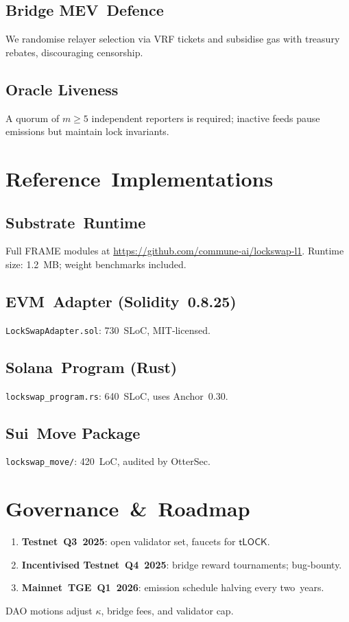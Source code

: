 \documentclass[11pt]{article}
\begin{document}
\subsection{Bridge MEV Defence}
We randomise relayer selection via VRF tickets and subsidise gas with treasury rebates, discouraging censorship.
\subsection{Oracle Liveness}
A quorum of $m\ge5$ independent reporters is required; inactive feeds pause emissions but maintain lock invariants.

\section{Reference Implementations}
\subsection{Substrate Runtime}
Full FRAME modules at \url{https://github.com/commune‑ai/lockswap‑l1}.  Runtime size: 1.2 MB; weight benchmarks included.
\subsection{EVM Adapter (Solidity 0.8.25)}
\texttt{LockSwapAdapter.sol}: 730 SLoC, MIT‑licensed.
\subsection{Solana Program (Rust)}
\texttt{lockswap_program.rs}: 640 SLoC, uses Anchor 0.30.
\subsection{Sui Move Package}
\texttt{lockswap_move/}: 420 LoC, audited by OtterSec.

\section{Governance & Roadmap}
\begin{enumerate}
\item \textbf{Testnet Q3 2025}: open validator set, faucets for $\mathsf{tLOCK}$.
\item \textbf{Incentivised Testnet Q4 2025}: bridge reward tournaments; bug‑bounty.
\item \textbf{Mainnet TGE Q1 2026}: emission schedule halving every two years.
\end{enumerate}
DAO motions adjust $\kappa$, bridge fees, and validator cap.
\end{document}
